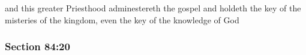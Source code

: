 		\begin{framed}
		\scriptsize
			\begin{compactdesc}
				\item[JSP] and this greater Priesthood adminestereth the gospel and holdeth the key of the misteries of the kingdom, even the key of the knowledge of God
			\end{compactdesc}
		\end{framed}

	\subsubsection{Section 84:20} %
		\label{DC84-20}

